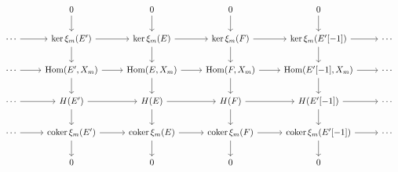 \documentclass[12pt]{standalone}
\begin{document}
        $$

\begin{tikzcd}
 & 0 \ar[d] & 0 \ar[d] & 0 \ar[d] & 0 \ar[d] \\
\cdots \ar[r] & \operatorname{ker} \xi_m(E^\prime) \ar[d]  \ar[r]  & 
\ker \xi_m(E) \ar[d]  \ar[r] & 
\ker \xi_m(F) \ar[d]  \ar[r] & \ker \xi_m(E^\prime[-1]) \ar[d]  \ar[r] 
& \cdots \\
\cdots  \ar[r] & \operatorname{Hom}(E^\prime,X_m) \ar[d] \ar[r] 
 & \operatorname{Hom}(E,X_m) \ar[d]  \ar[r] & 
\operatorname{Hom}(F,X_m) \ar[d]  \ar[r] & 
\operatorname{Hom}(E^\prime[-1],X_m) \ar[d] \ar[r]  & \cdots \\
\cdots \ar[r]  & H(E^\prime) \ar[r]  \ar[d] & \ar[d] H(E) \ar[r]  & 
H(F) \ar[d] \ar[r]  & H(E^\prime[-1]) \ar[d] \ar[r]  & \cdots \\ 
\cdots \ar[r]  & \operatorname{coker} \xi_m(E^\prime) \ar[d] \ar[r]  & 
\operatorname{coker} \xi_m(E) \ar[d]  \ar[r] & 
\operatorname{coker} \xi_m(F) \ar[d]  \ar[r] & 
\operatorname{coker} \xi_m(E^\prime[-1]) \ar[d]  \ar[r] & \cdots \\
& 0 & 0 & 0 & 0 \\
\end{tikzcd}
        $$
        
\end{document}
